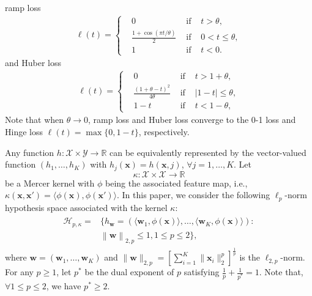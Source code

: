 \documentclass{article}
\begin{document}
ramp loss
\begin{align*}
  \ell(t)=
         \left\{
          \begin{aligned}
            &0                    &\text{ if }& t>\theta,\\
            &\frac{1+\cos(\pi t/\theta)}{2}&\text{ if }& 0<t\leq \theta,\\
            &1                &\text{ if }& t<0.
          \end{aligned}
          \right.
\end{align*}
and Huber loss
\begin{align*}
         \ell(t)=
         \left\{
          \begin{aligned}
            &0                    &\text{ if }& t>1+\theta,\\
            &\frac{(1+\theta-t)^2}{4\theta}&\text{ if }& |1-t|\leq \theta,\\
            &1-t                 &\text{ if }& t<1-\theta,
          \end{aligned}
          \right.
        \end{align*}
Note that when $\theta\rightarrow 0$, ramp loss and Huber loss converge to the  0-1 loss and
Hinge loss $\ell(t)=\max\{0,1-t\}$, respectively.

Any function $h:\mathcal{X}\times\mathcal{Y}\rightarrow \mathbb{R}$ can be equivalently represented by the vector-valued function
$(h_1,\ldots,h_K)$ with $h_j(\mathbf x)=h(\mathbf x,j)$, $\forall j=1,\ldots,K$.
Let $$\kappa:\mathcal{X}\times\mathcal{X}\rightarrow\mathbb{R}$$ be a Mercer kernel with $\phi$ being the associated feature map,
i.e., $\kappa(\mathbf x,\mathbf x')=\langle \phi(\mathbf x),\phi(\mathbf x')\rangle$.
In this paper, we consider the following $\ell_p$-norm hypothesis space associated with the kernel $\kappa$:
 \begin{align}
 \label{hypothspapce}
   \begin{aligned}
   \mathcal{H}_{p,\kappa}=&\Big\{h_\mathbf{w}=\left(\langle \mathbf w_1,\phi(\mathbf x)\rangle,\ldots, \langle\mathbf w_K,\phi(\mathbf x)\rangle\right):\\
  & \left\|\mathbf  w \right\|_{2,p}\leq 1, 1\leq p\leq 2
  \Big\},
   \end{aligned}
 \end{align}
 where $\mathbf w=(\mathbf w_1,\ldots,\mathbf w_K)$ and $\|\mathbf w\|_{2,p}=\left[\sum_{i=1}^K\|\mathbf x_i\|_2^p\right]^{\frac{1}{p}}$
 is the $\ell_{2,p}$-norm.
 For any $p\geq 1$, let $p^\ast$ be the dual exponent of $p$ satisfying $\frac{1}{p}+\frac{1}{p^\ast}=1$.
 Note that,  $\forall 1\leq p\leq 2$, we have $p^\ast\geq 2$.
\end{document}
